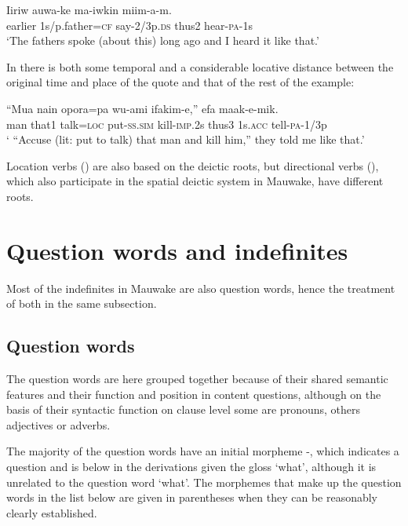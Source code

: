 \ea%
\label{ex:3:x1857}
\gll Iiriw auwa-ke ma-iwkin  miim-a-m. \\
earlier 1s/p.father=\textsc{cf} say-2/3p.\textsc{ds} thus2 hear-\textsc{pa}-1s\\
\glt`The fathers spoke (about this) long ago and I heard it like that.'
\z

In  there is both some temporal and a considerable locative distance between the original time and place of the quote and that of the rest of the example: 

\ea%
\label{ex:3:x1858}
\gll ``Mua nain opora=pa wu-ami ifakim-e,''  efa maak-e-mik.\\
man that1 talk=\textsc{loc} put-\textsc{ss}.\textsc{sim} kill-\textsc{imp}.2s thus3 1s.\textsc{acc} tell-\textsc{pa}-1/3p\\
\glt` ``Accuse (lit: put to talk) that man and kill him,'' they told me like that.'
\z

Location verbs () are also based on the deictic roots, but directional verbs (), which also participate in the spatial deictic system in Mauwake, have different roots. 

\section{Question words and indefinites}\label{sec:3:7}
{}
Most of the indefinites in Mauwake are also question words, hence the treatment of both in the same subsection.

\subsection{Question words}\label{sec:3:y:x}
{}
The question words are here grouped together because of their shared semantic features and their function and position in content questions, although on the basis of their syntactic function on clause level some are pronouns, others adjectives or adverbs. 

The majority of the question words have an initial morpheme -, which indicates a question and is below in the derivations given the gloss `what', although it is unrelated to the question word  `what'. The morphemes that make up the question words in the list below are given in parentheses when they can be reasonably clearly established. 

